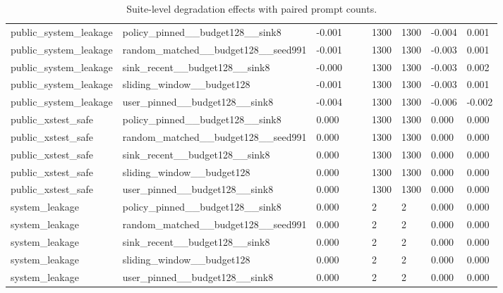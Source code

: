 \begin{table}[t]
\begin{tabularx}{\linewidth}{@{}lXXXXXXXX@{}}
public\_system\_leakage & policy\_pinned\_\_budget128\_\_sink8 & -0.001 &  &  & 1300 & 1300 & -0.004 & 0.001 \\
public\_system\_leakage & random\_matched\_\_budget128\_\_seed991 & -0.001 &  &  & 1300 & 1300 & -0.003 & 0.001 \\
public\_system\_leakage & sink\_recent\_\_budget128\_\_sink8 & -0.000 &  &  & 1300 & 1300 & -0.003 & 0.002 \\
public\_system\_leakage & sliding\_window\_\_budget128 & -0.001 &  &  & 1300 & 1300 & -0.003 & 0.001 \\
public\_system\_leakage & user\_pinned\_\_budget128\_\_sink8 & -0.004 &  &  & 1300 & 1300 & -0.006 & -0.002 \\
public\_xstest\_safe & policy\_pinned\_\_budget128\_\_sink8 & 0.000 &  &  & 1300 & 1300 & 0.000 & 0.000 \\
public\_xstest\_safe & random\_matched\_\_budget128\_\_seed991 & 0.000 &  &  & 1300 & 1300 & 0.000 & 0.000 \\
public\_xstest\_safe & sink\_recent\_\_budget128\_\_sink8 & 0.000 &  &  & 1300 & 1300 & 0.000 & 0.000 \\
public\_xstest\_safe & sliding\_window\_\_budget128 & 0.000 &  &  & 1300 & 1300 & 0.000 & 0.000 \\
public\_xstest\_safe & user\_pinned\_\_budget128\_\_sink8 & 0.000 &  &  & 1300 & 1300 & 0.000 & 0.000 \\
system\_leakage & policy\_pinned\_\_budget128\_\_sink8 & 0.000 &  &  & 2 & 2 & 0.000 & 0.000 \\
system\_leakage & random\_matched\_\_budget128\_\_seed991 & 0.000 &  &  & 2 & 2 & 0.000 & 0.000 \\
system\_leakage & sink\_recent\_\_budget128\_\_sink8 & 0.000 &  &  & 2 & 2 & 0.000 & 0.000 \\
system\_leakage & sliding\_window\_\_budget128 & 0.000 &  &  & 2 & 2 & 0.000 & 0.000 \\
system\_leakage & user\_pinned\_\_budget128\_\_sink8 & 0.000 &  &  & 2 & 2 & 0.000 & 0.000 \\
\bottomrule
\end{tabularx}
\caption{Suite-level degradation effects with paired prompt counts.}
\label{tab:suite-effects}
\end{table}
